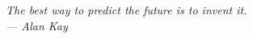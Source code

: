 \thispagestyle{empty}
\mbox{}
\begin{flushright}

{\selectfont
    \vspace{9cm}
    
    \it{
        The best way to predict the future is to invent it.
    }
    \\
    --- \textup{Alan Kay}
}
\end{flushright}